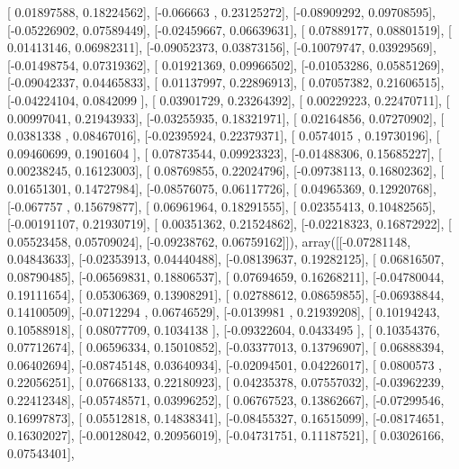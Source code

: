 \documentclass{article}
\begin{document}
       [ 0.01897588,  0.18224562],
       [-0.066663  ,  0.23125272],
       [-0.08909292,  0.09708595],
       [-0.05226902,  0.07589449],
       [-0.02459667,  0.06639631],
       [ 0.07889177,  0.08801519],
       [ 0.01413146,  0.06982311],
       [-0.09052373,  0.03873156],
       [-0.10079747,  0.03929569],
       [-0.01498754,  0.07319362],
       [ 0.01921369,  0.09966502],
       [-0.01053286,  0.05851269],
       [-0.09042337,  0.04465833],
       [ 0.01137997,  0.22896913],
       [ 0.07057382,  0.21606515],
       [-0.04224104,  0.0842099 ],
       [ 0.03901729,  0.23264392],
       [ 0.00229223,  0.22470711],
       [ 0.00997041,  0.21943933],
       [-0.03255935,  0.18321971],
       [ 0.02164856,  0.07270902],
       [ 0.0381338 ,  0.08467016],
       [-0.02395924,  0.22379371],
       [ 0.0574015 ,  0.19730196],
       [ 0.09460699,  0.1901604 ],
       [ 0.07873544,  0.09923323],
       [-0.01488306,  0.15685227],
       [ 0.00238245,  0.16123003],
       [ 0.08769855,  0.22024796],
       [-0.09738113,  0.16802362],
       [ 0.01651301,  0.14727984],
       [-0.08576075,  0.06117726],
       [ 0.04965369,  0.12920768],
       [-0.067757  ,  0.15679877],
       [ 0.06961964,  0.18291555],
       [ 0.02355413,  0.10482565],
       [-0.00191107,  0.21930719],
       [ 0.00351362,  0.21524862],
       [-0.02218323,  0.16872922],
       [ 0.05523458,  0.05709024],
       [-0.09238762,  0.06759162]]), array([[-0.07281148,  0.04843633],
       [-0.02353913,  0.04440488],
       [-0.08139637,  0.19282125],
       [ 0.06816507,  0.08790485],
       [-0.06569831,  0.18806537],
       [ 0.07694659,  0.16268211],
       [-0.04780044,  0.19111654],
       [ 0.05306369,  0.13908291],
       [ 0.02788612,  0.08659855],
       [-0.06938844,  0.14100509],
       [-0.0712294 ,  0.06746529],
       [-0.0139981 ,  0.21939208],
       [ 0.10194243,  0.10588918],
       [ 0.08077709,  0.1034138 ],
       [-0.09322604,  0.0433495 ],
       [ 0.10354376,  0.07712674],
       [ 0.06596334,  0.15010852],
       [-0.03377013,  0.13796907],
       [ 0.06888394,  0.06402694],
       [-0.08745148,  0.03640934],
       [-0.02094501,  0.04226017],
       [ 0.0800573 ,  0.22056251],
       [ 0.07668133,  0.22180923],
       [ 0.04235378,  0.07557032],
       [-0.03962239,  0.22412348],
       [-0.05748571,  0.03996252],
       [ 0.06767523,  0.13862667],
       [-0.07299546,  0.16997873],
       [ 0.05512818,  0.14838341],
       [-0.08455327,  0.16515099],
       [-0.08174651,  0.16302027],
       [-0.00128042,  0.20956019],
       [-0.04731751,  0.11187521],
       [ 0.03026166,  0.07543401],
\end{document}
